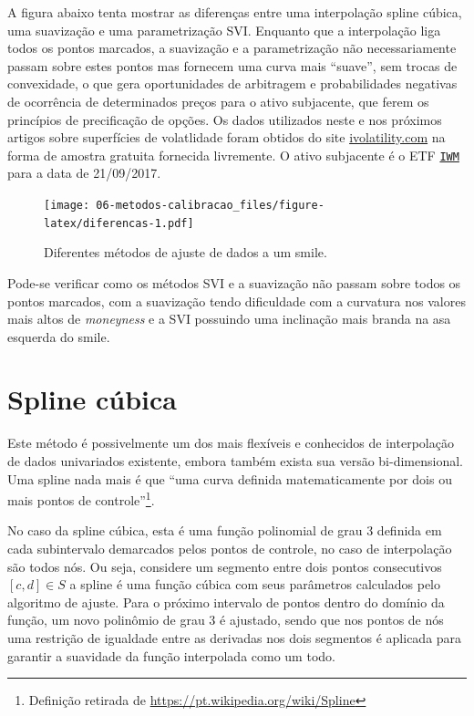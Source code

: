 \documentclass[]{book}
\let\rmarkdownfootnote\footnote%
\def\footnote{\protect\rmarkdownfootnote}
\theoremstyle{definition}
\theoremstyle{definition}
\theoremstyle{definition}
\theoremstyle{remark}
\begin{document}
A figura abaixo tenta mostrar as diferenças entre uma interpolação
spline cúbica, uma suavização e uma parametrização SVI. Enquanto que a
interpolação liga todos os pontos marcados, a suavização e a
parametrização não necessariamente passam sobre estes pontos mas
fornecem uma curva mais ``suave'', sem trocas de convexidade, o que gera
oportunidades de arbitragem e probabilidades negativas de ocorrência de
determinados preços para o ativo subjacente, que ferem os princípios de
precificação de opções. Os dados utilizados neste e nos próximos artigos
sobre superfícies de volatlidade foram obtidos do site
\href{http://www.ivolatility.com/doc/usa/IV_Raw_Delta_surface.csv}{ivolatility.com}
na forma de amostra gratuita fornecida livremente. O ativo subjacente é
o ETF
\href{https://www.ishares.com/us/products/239710/ishares-russell-2000-etf}{\texttt{IWM}}
para a data de 21/09/2017.

\begin{figure}
\centering
\texttt{[image: 06-metodos-calibracao\_files/figure-latex/diferencas-1.pdf]}
\caption{\label{fig:diferencas}Diferentes métodos de ajuste de dados a um
smile.}
\end{figure}

Pode-se verificar como os métodos SVI e a suavização não passam sobre
todos os pontos marcados, com a suavização tendo dificuldade com a
curvatura nos valores mais altos de \emph{moneyness} e a SVI possuindo
uma inclinação mais branda na asa esquerda do smile.

\section{Spline cúbica}\label{spline-cubica}

Este método é possivelmente um dos mais flexíveis e conhecidos de
interpolação de dados univariados existente, embora também exista sua
versão bi-dimensional. Uma spline nada mais é que ``uma curva definida
matematicamente por dois ou mais pontos de controle''\footnote{Definição
  retirada de \url{https://pt.wikipedia.org/wiki/Spline}}.

No caso da spline cúbica, esta é uma função polinomial de grau 3
definida em cada subintervalo demarcados pelos pontos de controle, no
caso de interpolação são todos nós. Ou seja, considere um segmento entre
dois pontos consecutivos \([c, d]\in S\) a spline é uma função cúbica
com seus parâmetros calculados pelo algoritmo de ajuste. Para o próximo
intervalo de pontos dentro do domínio da função, um novo polinômio de
grau 3 é ajustado, sendo que nos pontos de nós uma restrição de
igualdade entre as derivadas nos dois segmentos é aplicada para garantir
a suavidade da função interpolada como um todo.
\end{document}
